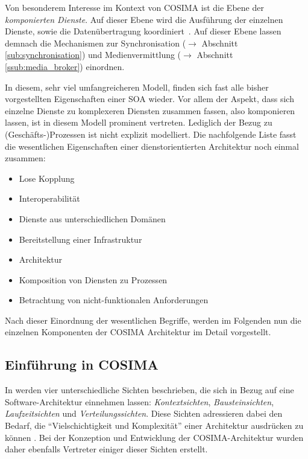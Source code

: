   Von besonderem Interesse im Kontext von COSIMA ist die Ebene der \emph{komponierten Dienste}. Auf dieser Ebene wird die Ausführung der einzelnen Dienste, sowie die Datenübertragung koordiniert~\cite[S. 8]{service_oriented_computing}. Auf dieser Ebene lassen demnach die Mechanismen zur Synchronisation ($\to$ Abschnitt \ref{sub:synchronisation}) und Medienvermittlung ($\to$ Abschnitt \ref{ssub:media_broker}) einordnen.
  
  In diesem, sehr viel umfangreicheren Modell, finden sich fast alle bisher vorgestellten Eigenschaften einer SOA wieder. Vor allem der Aspekt, dass sich einzelne Dienste zu komplexeren Diensten zusammen fassen, also komponieren lassen, ist in diesem Modell prominent vertreten. Lediglich der Bezug zu (Geschäfts-)Prozessen ist nicht explizit modelliert. Die nachfolgende Liste fasst die wesentlichen Eigenschaften einer dienstorientierten Architektur noch einmal zusammen:

  \begin{itemize}
    \item Lose Kopplung
    \item Interoperabilität
    \item Dienste aus unterschiedlichen Domänen
    \item Bereitstellung einer Infrastruktur
    \item Architektur
    \item Komposition von Diensten zu Prozessen
    \item Betrachtung von nicht-funktionalen Anforderungen
  \end{itemize}


  Nach dieser Einordnung der wesentlichen Begriffe, werden im Folgenden nun die einzelnen Komponenten der COSIMA Architektur im Detail vorgestellt.


\pagebreak

\subsection{Einführung in COSIMA} %
\label{sub:einfuehrung}

  In \citep[S. 83]{effektive_software_architekturen} werden vier unterschiedliche Sichten beschrieben, die sich in Bezug auf eine Software-Architektur einnehmen lassen: \emph{Kontextsichten}, \emph{Bausteinsichten}, \emph{Laufzeitsichten} und \emph{Verteilungssichten}. Diese Sichten adressieren dabei den Bedarf, die "`Vielschichtigkeit und Komplexität"' einer Architektur ausdrücken zu können \citep[S. 81]{effektive_software_architekturen}. Bei der Konzeption und Entwicklung der COSIMA-Architektur wurden daher ebenfalls Vertreter einiger dieser Sichten erstellt.
  
